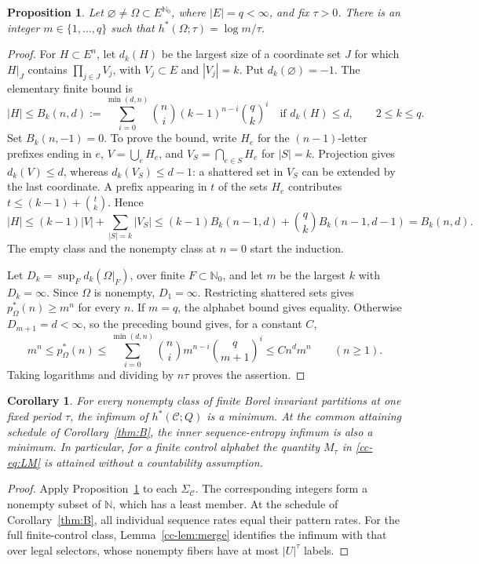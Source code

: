 \documentclass[11pt,reqno]{amsart}
\numberwithin{equation}{section}
\newtheorem{proposition}[theorem]{Proposition}
\newtheorem{corollary}[theorem]{Corollary}
\theoremstyle{definition}
\theoremstyle{definition}
\newcommand{\N}{\mathbb N}
\newcommand{\Nzero}{\mathbb N_0}
\newcommand{\C}{\mathcal C}
\newcommand{\hpat}{h^{*}}
\begin{document}
\begin{proposition}\label{prop:quantization}
Let $\varnothing\ne\Omega\subset E^{\Nzero}$, where $|E|=q<\infty$,
and fix $\tau>0$. There is an integer $m\in\{1,\ldots,q\}$ such that
$\hpat(\Omega;\tau)=\log m/\tau$.
\end{proposition}
\begin{proof}
For $H\subset E^n$, let $d_k(H)$ be the largest size of a coordinate
set $J$ for which $H|_J$ contains $\prod_{j\in J}V_j$, with
$V_j\subset E$ and $|V_j|=k$. Put $d_k(\varnothing)=-1$.
The elementary finite bound is
\[
 |H|\le B_k(n,d):=
 \sum_{i=0}^{\min(d,n)}\binom ni(k-1)^{n-i}\binom qk^i
 \quad\text{if }d_k(H)\le d,\qquad 2\le k\le q.
\]
Set $B_k(n,-1)=0$. To prove the bound, write $H_e$ for the
$(n-1)$-letter prefixes ending in $e$, $V=\bigcup_eH_e$, and
$V_S=\bigcap_{e\in S}H_e$ for $|S|=k$. Projection gives
$d_k(V)\le d$, whereas $d_k(V_S)\le d-1$: a shattered set in
$V_S$ can be extended by the last coordinate. A prefix appearing
in $t$ of the sets $H_e$ contributes
$t\le(k-1)+\binom tk$. Hence
\[
 |H|\le(k-1)|V|+\sum_{|S|=k}|V_S|
 \le(k-1)B_k(n-1,d)+\binom qk B_k(n-1,d-1)
 =B_k(n,d).
\]
The empty class and the nonempty class at $n=0$ start the induction.

Let $D_k=\sup_Fd_k(\Omega|_F)$, over finite $F\subset\Nzero$,
and let $m$ be the largest $k$ with $D_k=\infty$.
Since $\Omega$ is nonempty, $D_1=\infty$.
Restricting shattered sets gives $p_\Omega^*(n)\ge m^n$ for every
$n$. If $m=q$, the alphabet bound gives equality. Otherwise
$D_{m+1}=d<\infty$, so the preceding bound gives, for a constant $C$,
\[
 m^n\le p_\Omega^*(n)
 \le\sum_{i=0}^{\min(d,n)}\binom ni m^{n-i}\binom q{m+1}^i
 \le C n^d m^n\qquad(n\ge1).
\]
Taking logarithms and dividing by $n\tau$ proves the assertion.
\end{proof}

\begin{corollary}\label{cor:pattern-minimum}
For every nonempty class of finite Borel invariant partitions at
one fixed period $\tau$, the infimum of $\hpat(\C;Q)$ is a minimum.
At the common attaining schedule of Corollary~\ref{thm:B}, the inner
sequence-entropy infimum is also a minimum. In particular, for a
finite control alphabet the quantity $M_\tau$ in
\eqref{cc-eq:LM} is attained without a countability assumption.
\end{corollary}
\begin{proof}
Apply Proposition~\ref{prop:quantization} to each $\Sigma_\C$.
The corresponding integers form a nonempty subset of $\N$, which
has a least member. At the schedule of Corollary~\ref{thm:B}, all
individual sequence rates equal their pattern rates.
For the full finite-control class, Lemma~\ref{cc-lem:merge}
identifies the infimum with that over legal selectors, whose
nonempty fibers have at most $|U|^\tau$ labels.
\end{proof}
\end{document}
